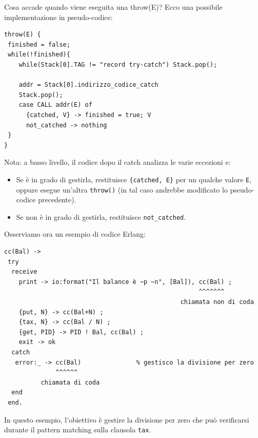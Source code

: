 \documentclass{article}
\begin{document}
Cosa accade quando viene eseguita una throw(E)? Ecco una possibile implementazione in pseudo-codice:
\begin{tcolorbox}
\begin{verbatim}
throw(E) {
 finished = false;
 while(!finished){
    while(Stack[0].TAG != "record try-catch") Stack.pop();

    addr = Stack[0].indirizzo_codice_catch
    Stack.pop();
    case CALL addr(E) of
      {catched, V} -> finished = true; V
      not_catched -> nothing
 }
}
\end{verbatim}
\end{tcolorbox}
\vspace{8pt}
Nota: a basso livello, il codice dopo il catch analizza le varie eccezioni e:
\begin{itemize}
    \item Se è in grado di gestirla, restituisce \texttt{\{catched, E\}} per un qualche valore \texttt{E}, oppure esegue un'altra \texttt{throw()} (in tal caso andrebbe modificato lo pseudo-codice precedente).
    \item Se non è in grado di gestirla, restituisce \texttt{not\_catched}.
\end{itemize}
\vspace{10pt}
Osserviamo ora un esempio di codice Erlang:
\begin{tcolorbox}
\begin{verbatim}
cc(Bal) ->
 try
  receive
    print -> io:format("Il balance è ~p ~n", [Bal]), cc(Bal) ;
                                                     ^^^^^^^
                                                chiamata non di coda
    {put, N} -> cc(Bal+N) ;
    {tax, N} -> cc(Bal / N) ;
    {get, PID} -> PID ! Bal, cc(Bal) ;
    exit -> ok
  catch
   error:_ -> cc(Bal)               % gestisco la divisione per zero
              ^^^^^^
          chiamata di coda
  end
 end.
\end{verbatim}
\end{tcolorbox}
\vspace{8pt}
In questo esempio, l'obiettivo è gestire la divisione per zero che può verificarsi durante il pattern matching sulla clausola \texttt{tax}.
\end{document}
